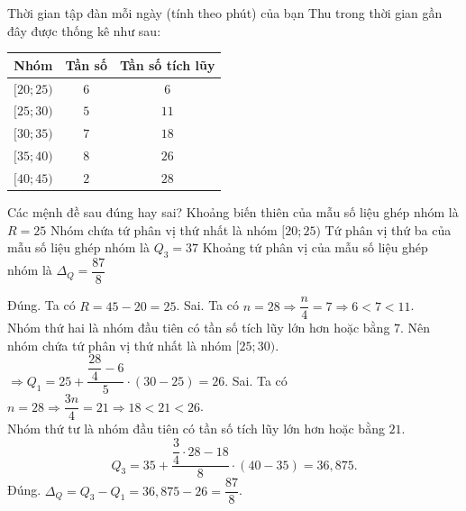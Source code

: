 \begin{ex}%
	Thời gian tập đàn mỗi ngày (tính theo phút) của bạn Thu trong thời gian gần đây được thống kê như sau:
	
	\begin{center}
		\begin{tabular}{|c|c|c|}
			\hline Nhóm & Tần số & Tần số tích lũy \\
			\hline$[20 ; 25)$ & $6$ & $6$ \\
			\hline$[25 ; 30)$ & $5$ & $11$ \\
			\hline$[30 ; 35)$ & $7$ & $18$ \\
			\hline$[35 ; 40)$ & $8$ & $26$ \\
			\hline$[40 ; 45)$ & $2$ & $28$ \\
			\hline
		\end{tabular}
	\end{center}
	Các mệnh đề sau đúng hay sai?
	\choiceTF
	{\True Khoảng biến thiên của mẫu số liệu ghép nhóm là $R=25$}
	{ Nhóm chứa tứ phân vị thứ nhất là nhóm $[20 ; 25)$}
	{ Tứ phân vị thứ ba của mẫu số liệu ghép nhóm là $Q_3=37$}
	{\True Khoảng tứ phân vị của mẫu số liệu ghép nhóm là $\Delta_Q=\dfrac{87}{8}$}
	\loigiai
	{
		\begin{itemchoice}
			\itemch Đúng. Ta có $R=45-20=25$.
			\itemch Sai. Ta có $n=28 \Rightarrow \dfrac{n}{4}=7 \Rightarrow 6<7<11$.\\
			Nhóm thứ hai là nhóm đầu tiên có tần số tích lũy lớn hơn hoặc bằng $7$.
			Nên nhóm chứa tứ phân vị thứ nhất là nhóm $[25 ; 30)$.\\
			$\Rightarrow Q_1=25+\dfrac{\dfrac{28}{4}-6}{5} \cdot(30-25)=26.$
			\itemch Sai. Ta có $n=28 \Rightarrow \dfrac{3 n}{4}=21 \Rightarrow 18<21<26$.\\
			Nhóm thứ tư là nhóm đầu tiên có tần số tích lũy lớn hơn hoặc bằng $21$.
			$$
			Q_3=35+\dfrac{\dfrac{3}{4} \cdot 28-18}{8} \cdot(40-35)=36{,}875.
			$$
			\itemch Đúng. $
			\Delta_Q=Q_3-Q_1=36{,}875-26=\dfrac{87}{8}
			$.
		\end{itemchoice}
	}
\end{ex}

